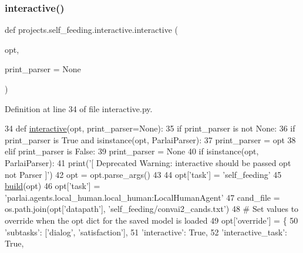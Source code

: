 \subsubsection{\texorpdfstring{interactive()}{interactive()}}
{\footnotesize\ttfamily def projects.\+self\+\_\+feeding.\+interactive.\+interactive (\begin{DoxyParamCaption}\item[{}]{opt,  }\item[{}]{print\+\_\+parser = {\ttfamily None} }\end{DoxyParamCaption})}



Definition at line 34 of file interactive.\+py.


\begin{DoxyCode}
34 \textcolor{keyword}{def }\hyperlink{namespaceprojects_1_1self__feeding_1_1interactive_aaebd4c577ab0371c73e8442be469ebab}{interactive}(opt, print\_parser=None):
35     \textcolor{keywordflow}{if} print\_parser \textcolor{keywordflow}{is} \textcolor{keywordflow}{not} \textcolor{keywordtype}{None}:
36         \textcolor{keywordflow}{if} print\_parser \textcolor{keywordflow}{is} \textcolor{keyword}{True} \textcolor{keywordflow}{and} isinstance(opt, ParlaiParser):
37             print\_parser = opt
38         \textcolor{keywordflow}{elif} print\_parser \textcolor{keywordflow}{is} \textcolor{keyword}{False}:
39             print\_parser = \textcolor{keywordtype}{None}
40     \textcolor{keywordflow}{if} isinstance(opt, ParlaiParser):
41         print(\textcolor{stringliteral}{'[ Deprecated Warning: interactive should be passed opt not Parser ]'})
42         opt = opt.parse\_args()
43 
44     opt[\textcolor{stringliteral}{'task'}] = \textcolor{stringliteral}{'self\_feeding'}
45     \hyperlink{namespaceparlai_1_1mturk_1_1tasks_1_1talkthewalk_1_1download_a8c0fbb9b6dfe127cb8c1bd6e7c4e33fd}{build}(opt)
46     opt[\textcolor{stringliteral}{'task'}] = \textcolor{stringliteral}{'parlai.agents.local\_human.local\_human:LocalHumanAgent'}
47     cand\_file = os.path.join(opt[\textcolor{stringliteral}{'datapath'}], \textcolor{stringliteral}{'self\_feeding/convai2\_cands.txt'})
48     \textcolor{comment}{# Set values to override when the opt dict for the saved model is loaded}
49     opt[\textcolor{stringliteral}{'override'}] = \{
50         \textcolor{stringliteral}{'subtasks'}: [\textcolor{stringliteral}{'dialog'}, \textcolor{stringliteral}{'satisfaction'}],
51         \textcolor{stringliteral}{'interactive'}: \textcolor{keyword}{True},
52         \textcolor{stringliteral}{'interactive\_task'}: \textcolor{keyword}{True},

\end{DoxyCode}
